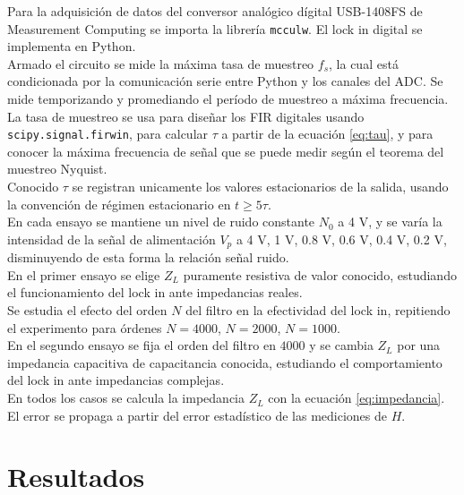 \documentclass[11pt,a4paper]{extarticle}
\begin{document}
\begin{multicols}{2}
Para la adquisición de datos del conversor analógico dígital USB-1408FS de
Measurement Computing se importa la librería \texttt{mcculw}\cite{mcculw}. El lock in digital se implementa en Python.\\

Armado el circuito se mide la máxima tasa de muestreo $f_s$, la cual está condicionada por la comunicación serie entre Python y los canales del ADC. 
Se mide temporizando y promediando el período de muestreo a máxima frecuencia.\\

La tasa de muestreo se usa para diseñar los FIR digitales usando \texttt{scipy.signal.firwin}, para calcular $\tau$ a partir de la ecuación \ref{eq:tau}, y para conocer la máxima frecuencia de señal que se puede medir según el teorema del muestreo Nyquist.\cite{haykin_4}\\


Conocido $\tau$ se registran unicamente los valores estacionarios de la salida, usando la convención de régimen estacionario en $t \ge 5\tau$.\\

En cada ensayo se mantiene un nivel de ruido constante $N_0$ a 4 V, y se varía la intensidad de la señal de alimentación $V_p$ a 4 V, 1 V, 0.8 V, 0.6 V, 0.4 V, 0.2 V, disminuyendo de esta forma la relación señal ruido.\\


En el primer ensayo se elige $Z_L$ puramente resistiva de valor conocido, estudiando el funcionamiento del lock in ante impedancias reales.\\ 

Se estudia el efecto del orden $N$ del filtro en la efectividad del lock in, repitiendo el experimento para órdenes $N=4000$, $N=2000$, $N=1000$.\\

En el segundo ensayo se fija el orden del filtro en $4000$ y se cambia $Z_L$ por una impedancia capacitiva de capacitancia conocida, estudiando el comportamiento del lock in ante impedancias complejas.\\

En todos los casos se calcula la impedancia $Z_L$ con la ecuación \ref{eq:impedancia}. El error se propaga a partir del error estadístico de las mediciones de $H$.

\section{Resultados}


\end{multicols}
\end{document}
